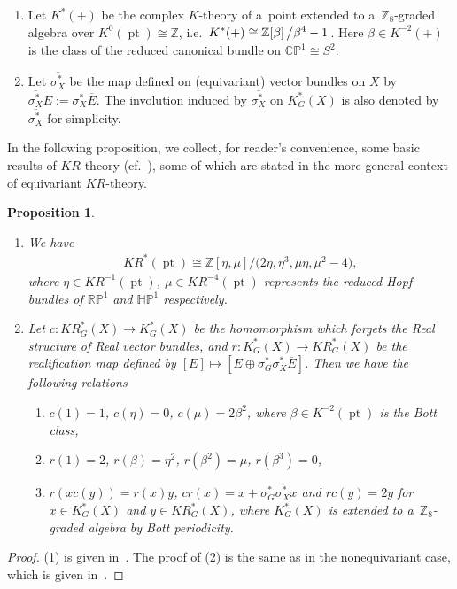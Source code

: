 \documentclass[pdftex]{sigma}
\numberwithin{equation}{section}
\newtheorem{Proposition}[Theorem]{Proposition}
{\theoremstyle{definition}
\newtheorem{Definition}[Theorem]{Definition}
\newtheorem{Example}[Theorem]{Example}
\newtheorem{Remark}[Theorem]{Remark}
}
\DeclareMathOperator{\pt}{pt}
\begin{document}
\begin{Definition}\quad
\begin{enumerate}\itemsep=0pt
\item
Let $K^*(+)$ be the complex $K$-theory of a~point extended to a~$\mathbb{Z}_8$-graded algebra over
$K^0(\pt)\cong\mathbb{Z}$, i.e.\
$\displaystyle K^*(+)\cong\mathbb{Z}[\beta]\left/\beta^4-1\right.$.
Here $\beta\in K^{-2}(+)$ is the class of the reduced canonical bundle on $\mathbb{CP}^1\cong S^2$.
\item
Let $\overline{\sigma_X^*}$ be the map def\/ined on (equivariant) vector bundles on $X$ by $\overline{\sigma_X^*}
E:=
\sigma_X^*\overline{E}$.
The involution induced by $\overline{\sigma_X^*}$ on $K^*_G(X)$ is also denoted by $\overline{\sigma_X^*}$ for simplicity.
\end{enumerate}
\end{Definition}
In the following proposition, we collect, for reader's convenience, some basic results of $KR$-theory
(cf.~\cite[Section~2]{Se}), some of which are stated in the more general context of equivariant $KR$-theory.
\begin{Proposition}\label{krprelim}\quad
\begin{enumerate}\itemsep=0pt
\item[$1.$]
We have
\begin{gather*}
KR^*(\pt)\cong\mathbb{Z}[\eta, \mu]\big/\big(2\eta, \eta^3, \mu\eta, \mu^2-4\big) ,
\end{gather*}
where $\eta\in KR^{-1}(\pt)$, $\mu\in KR^{-4}(\pt)$ represents the reduced Hopf bundles of
$\mathbb{R}\mathbb{P}^1$ and $\mathbb{H}\mathbb{P}^1$ respectively.
\item[$2.$]
Let $c: KR^*_G(X)\to K^*_G(X)$ be the homomorphism which forgets the Real structure of Real vector bundles, and $r:
K^*_G(X)\to KR^*_G(X)$ be the realification map defined by $[E]\mapsto [E\oplus
\sigma_G^*\sigma_X^*\overline{E}
]$.
Then we have the following relations
\begin{enumerate}\itemsep=0pt
\item[$(a)$]
$c(1)=1$, $c(\eta)=0$, $c(\mu)=2\beta^2$, where $\beta\in K^{-2}(\pt)$ is the Bott class,
\item[$(b)$]
$r(1)=2$, $r(\beta)=\eta^2$, $r(\beta^2)=\mu$, $r(\beta^3)=0$,
\item[$(c)$]
$r(xc(y))=r(x)y$, $cr(x)=x+
\sigma_G^*\overline{\sigma_X^*}
x$ and $rc(y)=2y$ for $x\in K^*_G(X)$ and $y\in KR^*_G(X)$, where $K^*_G(X)$ is extended to a~$\mathbb{Z}_8$-graded
algebra by Bott periodicity.
\end{enumerate}
\end{enumerate}
\end{Proposition}
\begin{proof}
(1) is given in~\cite[Section~2]{Se}.
The proof of (2) is the same as in the nonequivariant case, which is given in~\cite{At3}.
\end{proof}
\end{document}
